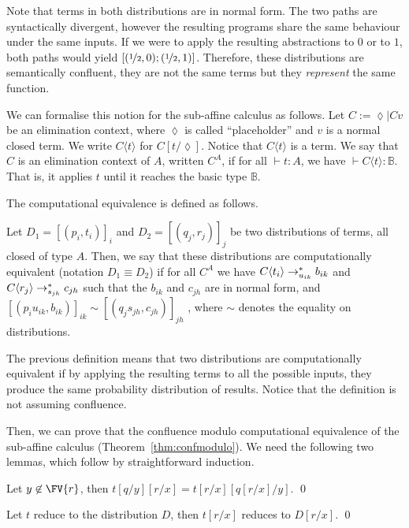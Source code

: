 Note that terms in both distributions are in normal form. The two paths are syntactically divergent, however the resulting programs share the same behaviour under the same inputs. If we were to apply the resulting abstractions to $0$ or to $1$, both paths would yield $[(\nicefrac 12, 0); (\nicefrac 12, 1)]$. Therefore, these distributions are semantically confluent, they are not the same terms but they \textit{represent} the same function.

We can formalise this notion for the sub-affine calculus as follows. Let 
\(
  C := \lozenge\mid Cv
\)
be an elimination context, where $\lozenge$ is called ``placeholder'' and $v$ is a normal closed term. We write $C\langle t\rangle$ for $C[t/\lozenge]$. Notice that $C\langle t\rangle$ is a term. We say that $C$ is an elimination context of $A$, written $C^A$, if for all $\vdash t:A$, we have $\vdash C\langle t\rangle:\mathbb B$. That is, it applies $t$ until it reaches the basic type $\mathbb B$.

The computational equivalence is defined as follows.
\begin{defin}
Let $D_1 = [(p_i,t_i)]_i$ and $D_2 = [(q_j,r_j)]_j$ be two distributions of
terms, all closed of type $A$. Then, we say that these distributions are
computationally equivalent (notation $D_1\equiv D_2$) if for all $C^A$ we have
$C\langle t_i\rangle\topr[u_{ik}]^* b_{ik}$ and $C\langle r_j\rangle\topr[s_{jh}]^* c_{jh}$ such that the
$b_{ik}$ and $c_{jh}$ are in normal form, and  $[(p_iu_{ik},b_{ik})]_{ik} \sim
[(q_js_{jh},c_{jh})]_{jh}$
, where $\sim$ denotes the equality on distributions.
\end{defin}
The previous definition means that two distributions are computationally equivalent if by applying the resulting terms to all the possible inputs, they produce the same probability distribution of results. Notice that the definition is not assuming confluence. 

Then, we can prove that the confluence modulo computational equivalence of the sub-affine calculus (Theorem~\ref{thm:confmodulo}). We need the following two lemmas, which follow by straightforward induction.
\begin{lem}\label{lem:subst}
Let $y\not\in\FV{r}$, then $t[q/y][r/x]= t[r/x][q[r/x]/y]$.
\qed
\end{lem}

\begin{lem}\label{lem:distRed}
Let $t$ reduce to the distribution $D$, then $t[r/x]$ reduces to $D[r/x]$.
\qed
\end{lem}

